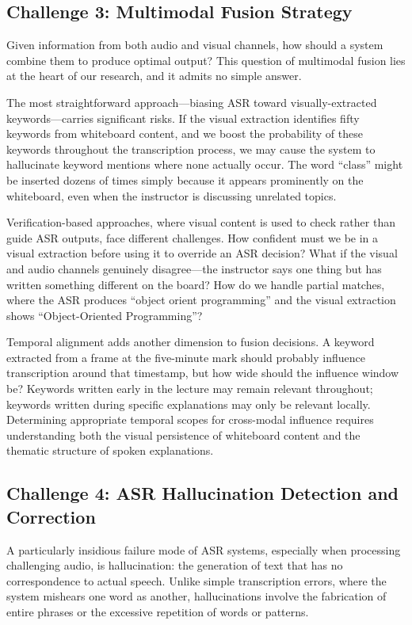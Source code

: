 \subsection{Challenge 3: Multimodal Fusion Strategy}

Given information from both audio and visual channels, how should a system combine them to produce optimal output? This question of multimodal fusion lies at the heart of our research, and it admits no simple answer.

The most straightforward approach---biasing ASR toward visually-extracted keywords---carries significant risks. If the visual extraction identifies fifty keywords from whiteboard content, and we boost the probability of these keywords throughout the transcription process, we may cause the system to hallucinate keyword mentions where none actually occur. The word ``class'' might be inserted dozens of times simply because it appears prominently on the whiteboard, even when the instructor is discussing unrelated topics.

Verification-based approaches, where visual content is used to check rather than guide ASR outputs, face different challenges. How confident must we be in a visual extraction before using it to override an ASR decision? What if the visual and audio channels genuinely disagree---the instructor says one thing but has written something different on the board? How do we handle partial matches, where the ASR produces ``object orient programming'' and the visual extraction shows ``Object-Oriented Programming''?

Temporal alignment adds another dimension to fusion decisions. A keyword extracted from a frame at the five-minute mark should probably influence transcription around that timestamp, but how wide should the influence window be? Keywords written early in the lecture may remain relevant throughout; keywords written during specific explanations may only be relevant locally. Determining appropriate temporal scopes for cross-modal influence requires understanding both the visual persistence of whiteboard content and the thematic structure of spoken explanations.

\subsection{Challenge 4: ASR Hallucination Detection and Correction}

A particularly insidious failure mode of ASR systems, especially when processing challenging audio, is hallucination: the generation of text that has no correspondence to actual speech. Unlike simple transcription errors, where the system mishears one word as another, hallucinations involve the fabrication of entire phrases or the excessive repetition of words or patterns.

